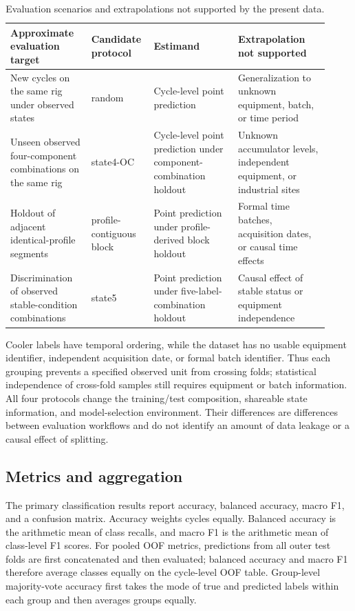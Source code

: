 \documentclass[11pt,a4paper]{article}
\newcommand{\toprule}{\hline}
\newcommand{\midrule}{\hline}
\newcommand{\bottomrule}{\hline}
\begin{document}
\begin{table}[htbp]
\centering\small
\caption{Evaluation scenarios and extrapolations not supported by the present data.}
\label{tab:decision}
\begin{tabular}{p{0.24\linewidth}p{0.16\linewidth}p{0.25\linewidth}p{0.27\linewidth}}
\toprule
Approximate evaluation target & Candidate protocol & Estimand & Extrapolation not supported\\
\midrule
New cycles on the same rig under observed states & random & Cycle-level point prediction & Generalization to unknown equipment, batch, or time period\\
Unseen observed four-component combinations on the same rig & state4-OC & Cycle-level point prediction under component-combination holdout & Unknown accumulator levels, independent equipment, or industrial sites\\
Holdout of adjacent identical-profile segments & profile-contiguous block & Point prediction under profile-derived block holdout & Formal time batches, acquisition dates, or causal time effects\\
Discrimination of observed stable-condition combinations & state5 & Point prediction under five-label-combination holdout & Causal effect of stable status or equipment independence\\
\bottomrule
\end{tabular}
\end{table}

Cooler labels have temporal ordering, while the dataset has no usable equipment identifier, independent acquisition date, or formal batch identifier. Thus each grouping prevents a specified observed unit from crossing folds; statistical independence of cross-fold samples still requires equipment or batch information. All four protocols change the training/test composition, shareable state information, and model-selection environment. Their differences are differences between evaluation workflows and do not identify an amount of data leakage or a causal effect of splitting.

\subsection{Metrics and aggregation}

The primary classification results report accuracy, balanced accuracy, macro F1, and a confusion matrix. Accuracy weights cycles equally. Balanced accuracy is the arithmetic mean of class recalls, and macro F1 is the arithmetic mean of class-level F1 scores. For pooled OOF metrics, predictions from all outer test folds are first concatenated and then evaluated; balanced accuracy and macro F1 therefore average classes equally on the cycle-level OOF table. Group-level majority-vote accuracy first takes the mode of true and predicted labels within each group and then averages groups equally.
\end{document}
